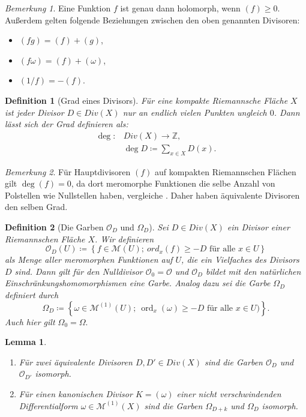 \documentclass[11pt,a4paper,toc=bibliography]{scrartcl}
\theoremstyle{thm}
\newtheorem{lemma}{Lemma}[section]
\theoremstyle{def}
\newtheorem{defi}{Definition}[section]
\theoremstyle{remark}
\newtheorem*{bem}{Bemerkung}
\DeclareMathOperator{\ord}{ord}
\begin{document}
\begin{bem}
	Eine Funktion $f$ ist genau dann holomorph, wenn $(f)\geq 0$. Außerdem gelten folgende Beziehungen zwischen den oben genannten Divisoren:
	\begin{itemize}
		\item $(fg)=(f)+(g)$,
		\item $(f\omega)=(f)+(\omega)$,
		\item $(1/f)=-(f) $.
	\end{itemize}
\end{bem}
\begin{defi}[Grad eines Divisors]
	Für eine kompakte Riemannsche Fläche $X$ ist jeder Divisor $D\in Div(X)$ nur an endlich vielen Punkten ungleich $0$. Dann lässt sich der Grad definieren als:
	\begin{align*}
		\deg:&Div(X)\rightarrow \mathbb{Z},\\
			&\deg D\coloneqq \sum_{x\in X}D(x).
	\end{align*}
	\end{defi}
\begin{bem}
	Für Hauptdivisoren $(f)$ auf kompakten Riemannschen Flächen gilt $\deg(f)=0$, da dort meromorphe Funktionen die selbe Anzahl von Polstellen wie Nullstellen haben, vergleiche \cite[~S.28]{forster}. Daher haben äquivalente Divisoren den selben Grad.
\end{bem}
\begin{defi}[Die Garben $\mathcal{O}_D$ und $\Omega_D$]
	Sei $D\in Div(X)$ ein Divisor einer Riemannschen Fläche $X$. Wir definieren
	\[\mathcal{O}_D(U)\coloneqq \left\{ f\in\mathcal{M}(U);~\textstyle{ord_x (f)}\geq -D\text{ für alle }x\in U \right\}
	\]
	als Menge aller meromorphen Funktionen auf $U$, die ein Vielfaches des Divisors $D$ sind. Dann gilt für den Nulldivisor $\mathcal{O}_0=\mathcal{O}$ und $\mathcal{O}_D$ bildet mit den natürlichen Einschränkungshomomorphismen eine Garbe. Analog dazu sei die Garbe $\Omega_D$ definiert durch
	\[
	\Omega_D\coloneqq \left\{\omega \in \mathcal{M}^{(1)}(U); ~\textstyle{\ord_x (\omega)}\geq -D\text{ für alle } x\in U)\right\}.
	\]
	Auch hier gilt $\Omega_0=\Omega.$
\end{defi}
\begin{lemma}
	\begin{enumerate}
		\item Für zwei äquivalente Divisoren $D,D'\in Div(X)$ sind die Garben $\mathcal{O}_D$ und $\mathcal{O}_{D'}$ isomorph.
		\item 
		Für einen kanonischen Divisor $K=(\omega)$ einer nicht verschwindenden Differentialform $\omega\in \mathcal{M}^{(1)}(X)$ sind die Garben $\Omega_{D+k}$ und $\Omega_D$ isomorph.
	\end{enumerate}
\end{lemma}
\end{document}
